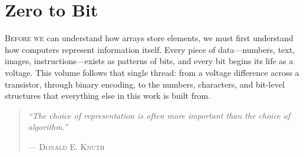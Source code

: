%
%
%
%

%
\part{Zero to Bit}
\label{part:bitgenesis}

\begin{partintro}
\lettrine[lines=3]{B}{efore we} can understand how arrays store elements, we must first understand how computers represent information itself. Every piece of data---numbers, text, images, instructions---exists as patterns of bits, and every bit begins its life as a voltage. This volume follows that single thread: from a voltage difference across a transistor, through binary encoding, to the numbers, characters, and bit-level structures that everything else in this work is built from.

\begin{quote}
\textit{``The choice of representation is often more important than the choice of algorithm.''}

\hfill--- \textsc{Donald E. Knuth}
\end{quote}
\end{partintro}


